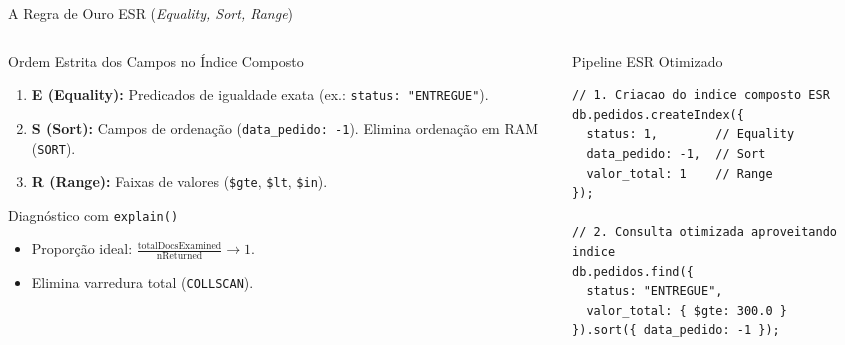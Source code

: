 \begin{frame}[fragile]{A Regra de Ouro ESR (\textit{Equality, Sort, Range})}
  \vspace{0.1cm}
  \begin{columns}[t,onlytextwidth]
    \begin{column}{0.50\textwidth}
      \alert{Ordem Estrita dos Campos no Índice Composto}\par
      \footnotesize
      \begin{enumerate}
        \item \textbf{E (Equality):} Predicados de igualdade exata (ex.: \lstinline[language=mongosh, basicstyle=\footnotesize\ttfamily]|status: "ENTREGUE"|).
        \item \textbf{S (Sort):} Campos de ordenação (\lstinline[language=mongosh, basicstyle=\footnotesize\ttfamily]|data_pedido: -1|). Elimina ordenação em RAM (\lstinline[language=mongosh, basicstyle=\footnotesize\ttfamily]|SORT|).
        \item \textbf{R (Range):} Faixas de valores (\lstinline[language=mongosh, basicstyle=\footnotesize\ttfamily]|$gte|, \lstinline[language=mongosh, basicstyle=\footnotesize\ttfamily]|$lt|, \lstinline[language=mongosh, basicstyle=\footnotesize\ttfamily]|$in|).
      \end{enumerate}
      
      \vspace{0.15cm}
      \alert{Diagnóstico com \lstinline[language=mongosh, basicstyle=\footnotesize\ttfamily]|explain()|}\par
      \footnotesize
      \begin{itemize}
        \item Proporção ideal: $\frac{\text{totalDocsExamined}}{\text{nReturned}} \to 1$.
        \item Elimina varredura total (\lstinline[language=mongosh, basicstyle=\footnotesize\ttfamily]|COLLSCAN|).
      \end{itemize}
    \end{column}
    
    \begin{column}{0.48\textwidth}
      \alert{Pipeline ESR Otimizado}\par
      \vspace{0.05cm}
      \begin{lstlisting}[language=mongosh]
// 1. Criacao do indice composto ESR
db.pedidos.createIndex({
  status: 1,        // Equality
  data_pedido: -1,  // Sort
  valor_total: 1    // Range
});

// 2. Consulta otimizada aproveitando indice
db.pedidos.find({
  status: "ENTREGUE",
  valor_total: { $gte: 300.0 }
}).sort({ data_pedido: -1 });
      \end{lstlisting}
    \end{column}
  \end{columns}
\end{frame}

